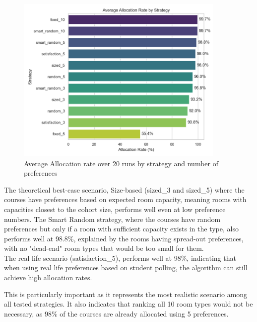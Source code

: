 \documentclass[a4paper, oneside]{article}
\theoremstyle{plain}
\begin{document}
\begin{minipage}{0.55\textwidth}
	\begin{figure}[H]
		\centering
		\includegraphics[width=0.9\textwidth]{images/allocation_rate.png}
		\caption{Average Allocation rate over 20 runs by strategy and number of preferences}
	\end{figure}
\end{minipage}
\hfill
\begin{minipage}{0.4\textwidth}
	The theoretical best-case scenario, Size-based (sized\_3 and sized\_5) where the courses have preferences based on expected room capacity, meaning rooms with capacities closest to the cohort size, performs
	well even at low preference numbers. The Smart Random strategy, where the courses have random preferences but only if a room with sufficient capacity exists in the type, also performs well at 98.8\%,
	explained by the rooms having spread-out preferences, with no "dead-end" room types that would be too small for them.\\

	The real life scenario (satisfaction\_5), performs well at 98\%, indicating that when using real life preferences based on student polling, the algorithm can still achieve high allocation rates.\\
\end{minipage}
\linebreak

This is particularly important as it represents the most realistic scenario among all tested strategies. It also indicates that ranking all 10 room types would not be necessary, as 98\% of the
courses are already allocated using 5 preferences.
\end{document}
